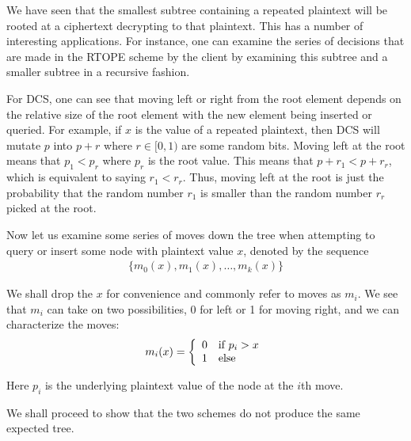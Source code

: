 \documentclass[12pt]{article}
\begin{document}
We have seen that the smallest subtree containing a repeated plaintext will be rooted at a ciphertext decrypting to that plaintext. This has a number of interesting applications. For instance, one can examine the series of decisions that are made in the RTOPE scheme by the client by examining this subtree and a smaller subtree in a recursive fashion.

For DCS, one can see that moving left or right from the root element depends on the relative size of the root element with the new element being inserted or queried. For example, if $x$ is the value of a repeated plaintext, then DCS will mutate $p$ into $p + r$ where $r \in [0,1)$ are some random bits. Moving left at the root means that $p_1 < p_r$ where $p_r$ is the root value. This means that $p + r_1 < p + r_r$, which is equivalent to saying $r_1 < r_r$. Thus, moving left at the root is just the probability that the random number $r_1$ is smaller than the random number $r_r$ picked at the root.

  Now let us examine some series of moves down the tree when attempting to query or insert some node with plaintext value $x$, denoted by the sequence
  \begin{eqnarray}
    \{ m_0(x), m_1(x), \ldots, m_k(x) \}
  \end{eqnarray}

  We shall drop the $x$ for convenience and commonly refer to moves as $m_i$. We see that $m_i$ can take on two possibilities, 0 for left or 1 for moving right, and we can characterize the moves:
  \begin{eqnarray}
    m_i(x) = \left\{ \begin{array}{l l}
        0 & \textrm{if } p_i > x \\
        1 & \textrm{else}
    \end{array} \right.
  \end{eqnarray}

  Here $p_i$ is the underlying plaintext value of the node at the $i$th move.

  We shall proceed to show that the two schemes do not produce the same expected tree.
\end{document}
